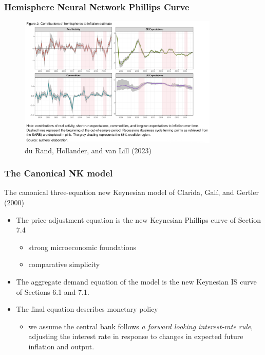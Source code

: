 \documentclass[10pt, xcolor=x11names, table]{beamer}
\begin{document}
\begin{frame}
\frametitle{Hemisphere Neural Network Phillips Curve}
\begin{figure}
\includegraphics[width=0.85\textwidth]{images/dHv_2023_PCneural.png}
\caption{{\footnotesize{du Rand, Hollander, and van Lill (2023)}}}
\end{figure}

\end{frame}	


\begin{frame}\frametitle{The Canonical NK model}
The canonical three-equation new Keynesian model of Clarida, Gal{\'{i}}, and Gertler (2000)
\begin{itemize}
\item The price-adjustment equation is the new Keynesian Phillips curve of Section 7.4
	\begin{itemize}
	\item strong microeconomic foundations
	\item comparative simplicity
	\end{itemize}
\item The aggregate demand equation of the model is the new Keynesian IS curve of Sections 6.1 and 7.1.
\item The final equation describes monetary policy
	\begin{itemize}
	\item we assume the central bank follows \textit{a forward looking interest-rate rule}, adjusting the interest rate in response to changes in expected future inflation and output.
	\end{itemize}
\end{itemize}
\end{frame}
\end{document}
